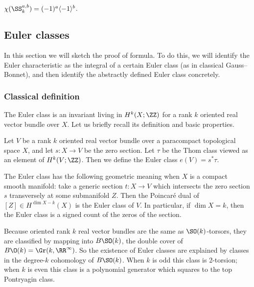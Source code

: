 \begin{proposition}
	$\chi(\SS^{a,b}_k) = (-1)^a\langle -1\rangle^b$.
\end{proposition}



\subsection{Euler classes}

In this section we will sketch the proof of formula. To do this, we will identify the Euler characteristic as the integral of a certain Euler class (as in classical Gauss--Bonnet), and then identify the abstractly defined Euler class concretely. 

\subsubsection{Classical definition}

The Euler class is an invariant living in $H^k(X;\ZZ)$ for a rank $k$ oriented real vector bundle over $X$. Let us briefly recall its definition and basic properties.

\begin{definition}
	Let $V$ be a rank $k$ oriented real vector bundle over a paracompact topological space $X$, and let $s:X\to V$ be the zero section. Let $\tau$ be the Thom class viewed as an element of $H^k(V;\ZZ)$. Then we define the Euler class $e(V) = s^*\tau$.
\end{definition}



\begin{rem}
	The Euler class has the following geometric meaning when $X$ is a compact smooth manifold: take a generic section $t:X\to V$ which intersects the zero section $s$ transversely at some submanifold $Z$. Then the Poincar\'e dual of $[Z]\in H^{\dim X - k}(X)$ is the Euler class of $V$. In particular, if $\dim X = k$, then the Euler class is a signed count of the zeros of the section.
\end{rem}


\begin{rem}
Because oriented rank $k$ real vector bundles are the same as $\SO(k)$-torsors, they are classified by mapping into $B\SO(k)$, the double cover of $B\O(k)=\Gr(k,\RR^\infty)$. So the existence of Euler classes are explained by classes in the degree-$k$ cohomology of $B\SO(k)$. When $k$ is odd this class is 2-torsion; when $k$ is even this class is a polynomial generator which squares to the top Pontryagin class.
\end{rem}


